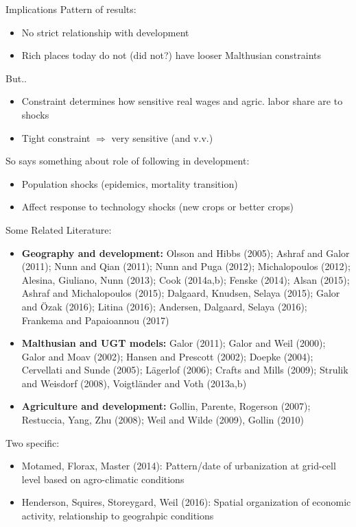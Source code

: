 \documentclass[10pt, xcolor=dvipsnames]{beamer}
\begin{document}
\begin{frame}{Implications}
Pattern of results:
\begin{itemize}
  \item No strict relationship with development
  \item Rich places today do not (did not?) have looser Malthusian constraints
\end{itemize}

\vspace{.2cm} But..
\begin{itemize}
  \item Constraint determines how sensitive real wages and agric. labor share are to shocks
  \item Tight constraint $\Rightarrow$ very sensitive (and v.v.)
\end{itemize}

\vspace{.2cm} So says something about role of following in development:
\begin{itemize}
  \item Population shocks (epidemics, mortality transition)
  \item Affect response to technology shocks (new crops or better crops)
\end{itemize}

\end{frame}


\begin{frame}{Some Related Literature:}
\begin{itemize}
  \item \textbf{Geography and development:} Olsson and Hibbs (2005); Ashraf and Galor (2011); Nunn and Qian (2011); Nunn and Puga (2012); Michalopoulos (2012); Alesina, Giuliano, Nunn (2013); Cook (2014a,b); Fenske (2014); Alsan (2015); Ashraf and Michalopoulos (2015); Dalgaard, Knudsen, Selaya (2015); Galor and {\"O}zak (2016); Litina (2016); Andersen, Dalgaard, Selaya (2016); Frankema and Papaioannou (2017)
  \item \textbf{Malthusian and UGT models:} Galor (2011); Galor and Weil (2000); Galor and Moav (2002); Hansen and Prescott (2002); Doepke (2004); Cervellati and Sunde (2005); L{\"a}gerlof (2006); Crafts and Mills (2009); Strulik and Weisdorf (2008), Voigtl{\"a}nder and Voth (2013a,b)
  \item \textbf{Agriculture and development:} Gollin, Parente, Rogerson (2007); Restuccia, Yang, Zhu (2008); Weil and Wilde (2009), Gollin (2010)
\end{itemize}

\vspace{.2cm} Two specific:
\begin{itemize}
  \item Motamed, Florax, Master (2014): Pattern/date of urbanization at grid-cell level based on agro-climatic conditions
  \item Henderson, Squires, Storeygard, Weil (2016): Spatial organization of economic activity, relationship to geograhpic conditions
\end{itemize}

\end{frame}
\end{document}
